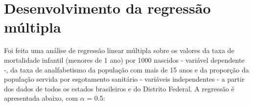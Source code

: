 \chapter{Desenvolvimento da regressão múltipla}
\label{ref:desenvolvimento}
Foi feita uma análise de regressão linear múltipla sobre os valores da taxa de mortalidade infantil (menores de 1 ano) por 1000 nascidos - variável dependente -, da taxa de analfabetismo da população com mais de 15 anos e da proporção da população servida por esgotamento sanitário - variáveis independentes - a partir dos dados de todos os estados brasileiros e do Distrito Federal. A regressão é apresentada abaixo, com $\alpha$ = 0.5:
\begin{table}[h]
\centering
{}
\end{table}
